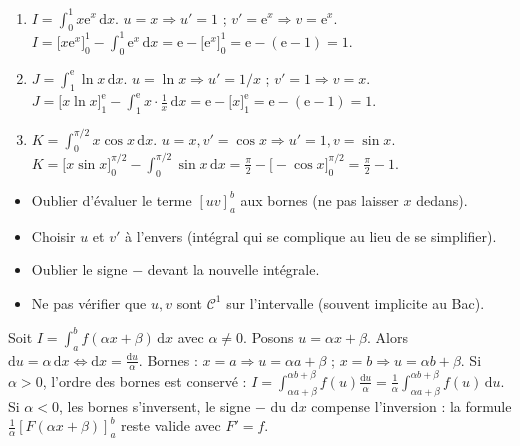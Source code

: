 \documentclass[11pt]{article}
\begin{document}
\begin{exemplebox}
\begin{enumerate}
  \item $I=\int_0^1 x\mathrm{e}^x\,\mathrm{d}x$. $u=x\Rightarrow u'=1$ ; $v'=\mathrm{e}^x\Rightarrow v=\mathrm{e}^x$.
  $I = \big[x\mathrm{e}^x\big]_0^1 - \int_0^1 \mathrm{e}^x\,\mathrm{d}x = \mathrm{e} - \big[\mathrm{e}^x\big]_0^1 = \mathrm{e} - (\mathrm{e}-1) = 1$.
  \item $J=\int_1^{\mathrm{e}} \ln x\,\mathrm{d}x$. $u=\ln x\Rightarrow u'=1/x$ ; $v'=1\Rightarrow v=x$.
  $J = \big[x\ln x\big]_1^{\mathrm{e}} - \int_1^{\mathrm{e}} x\cdot\frac{1}{x}\,\mathrm{d}x = \mathrm{e} - \big[x\big]_1^{\mathrm{e}} = \mathrm{e} - (\mathrm{e}-1) = 1$.
  \item $K=\int_0^{\pi/2} x\cos x\,\mathrm{d}x$. $u=x, v'=\cos x \Rightarrow u'=1, v=\sin x$.
  $K = \big[x\sin x\big]_0^{\pi/2} - \int_0^{\pi/2} \sin x\,\mathrm{d}x = \frac{\pi}{2} - \big[-\cos x\big]_0^{\pi/2} = \frac{\pi}{2} - 1$.
\end{enumerate}
\end{exemplebox}

\begin{attention}
\begin{itemize}
  \item Oublier d'évaluer le terme $[uv]_a^b$ aux bornes (ne pas laisser $x$ dedans).
  \item Choisir $u$ et $v'$ à l'envers (intégral qui se complique au lieu de se simplifier).
  \item Oublier le signe $-$ devant la nouvelle intégrale.
  \item Ne pas vérifier que $u,v$ sont $\mathcal{C}^1$ sur l'intervalle (souvent implicite au Bac).
\end{itemize}
\end{attention}

\begin{experience}
Soit $I=\int_a^b f(\alpha x+\beta)\,\mathrm{d}x$ avec $\alpha\ne 0$. Posons $u=\alpha x+\beta$. Alors $\mathrm{d}u = \alpha\,\mathrm{d}x \iff \mathrm{d}x = \frac{\mathrm{d}u}{\alpha}$.
Bornes : $x=a \Rightarrow u=\alpha a+\beta$ ; $x=b \Rightarrow u=\alpha b+\beta$.
Si $\alpha>0$, l'ordre des bornes est conservé : $I = \int_{\alpha a+\beta}^{\alpha b+\beta} f(u)\frac{\mathrm{d}u}{\alpha} = \frac{1}{\alpha}\int_{\alpha a+\beta}^{\alpha b+\beta} f(u)\,\mathrm{d}u$.
Si $\alpha<0$, les bornes s'inversent, le signe $-$ du $\mathrm{d}x$ compense l'inversion : la formule $\frac{1}{\alpha}[F(\alpha x+\beta)]_a^b$ reste valide avec $F'=f$.
\end{experience}
\end{document}
